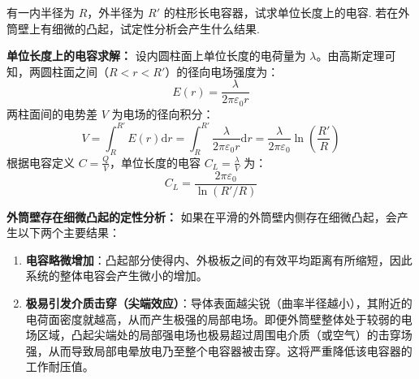 \begin{exercise}\label{ex:16.4}
有一内半径为 $R$，外半径为 $R'$ 的柱形长电容器，试求单位长度上的电容. 若在外筒壁上有细微的凸起，试定性分析会产生什么结果.
\end{exercise}
\begin{solution}
\textbf{单位长度上的电容求解：}
设内圆柱面上单位长度的电荷量为 $\lambda$。由高斯定理可知，两圆柱面之间（$R < r < R'$）的径向电场强度为：
$$ E(r) = \frac{\lambda}{2\pi\varepsilon_0 r} $$
两柱面间的电势差 $V$ 为电场的径向积分：
$$ V = \int_R^{R'} E(r) \mathrm{d}r = \int_R^{R'} \frac{\lambda}{2\pi\varepsilon_0 r} \mathrm{d}r = \frac{\lambda}{2\pi\varepsilon_0} \ln\left( \frac{R'}{R} \right) $$
根据电容定义 $C = \frac{Q}{V}$，单位长度的电容 $C_L = \frac{\lambda}{V}$ 为：
$$ C_L = \frac{2\pi\varepsilon_0}{\ln(R'/R)} $$

\textbf{外筒壁存在细微凸起的定性分析：}
如果在平滑的外筒壁内侧存在细微凸起，会产生以下两个主要结果：
\begin{enumerate}
    \item \textbf{电容略微增加}：凸起部分使得内、外极板之间的有效平均距离有所缩短，因此系统的整体电容会产生微小的增加。
    \item \textbf{极易引发介质击穿（尖端效应）}：导体表面越尖锐（曲率半径越小），其附近的电荷面密度就越高，从而产生极强的局部电场。即便外筒壁整体处于较弱的电场区域，凸起尖端处的局部强电场也极易超过周围电介质（或空气）的击穿场强，从而导致局部电晕放电乃至整个电容器被击穿。这将严重降低该电容器的工作耐压值。
\end{enumerate}
\end{solution}

